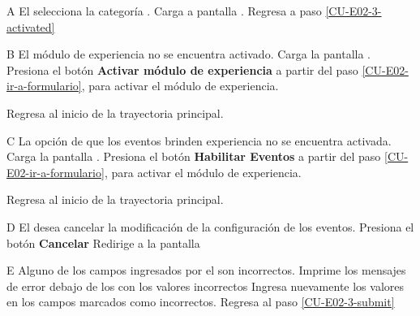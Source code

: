 \begin{UCtrayectoriaA}{A}{%
El  selecciona la categoría .
}
  \Sistema Carga a pantalla .
  \Actor Regresa a paso \ref{CU-E02-3-activated}
\end{UCtrayectoriaA}

\begin{UCtrayectoriaA}{B}{%
El módulo de experiencia no se encuentra activado.
}
  \Sistema Carga la pantalla .
  \Actor Presiona el botón {\bf Activar módulo de experiencia}
   a partir del paso \ref{CU-E02-ir-a-formulario},
                     para activar el módulo de experiencia.

  \Sistema Regresa al inicio de la trayectoria principal.
\end{UCtrayectoriaA}

\begin{UCtrayectoriaA}{C}{%
La opción de que los eventos brinden experiencia no se encuentra activada.
}
  \Sistema Carga la pantalla .
  \Actor Presiona el botón {\bf Habilitar Eventos}
   a partir del paso \ref{CU-E02-ir-a-formulario},
                     para activar el módulo de experiencia.

  \Sistema Regresa al inicio de la trayectoria principal.
\end{UCtrayectoriaA}

\begin{UCtrayectoriaA}{D}{%
El  desea cancelar la modificación de la configuración
de los eventos.
}
  \Actor Presiona el botón {\bf Cancelar}
  \Sistema Redirige a la pantalla 
\end{UCtrayectoriaA}

\begin{UCtrayectoriaA}{E}{%
Alguno de los campos ingresados por el  son incorrectos.
}
  \Sistema Imprime los mensajes de error debajo de los con los valores incorrectos
  \Actor Ingresa nuevamente los valores en los campos marcados como incorrectos.
  \Sistema Regresa al paso \ref{CU-E02-3-submit}
\end{UCtrayectoriaA}
